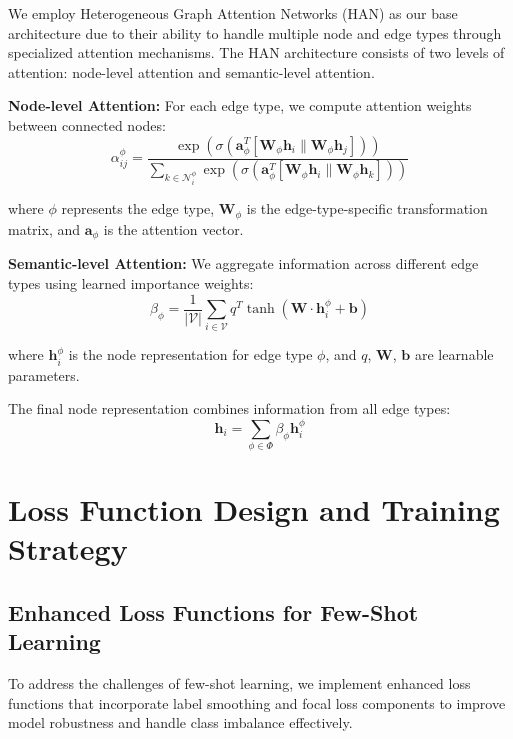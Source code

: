 We employ Heterogeneous Graph Attention Networks (HAN) as our base architecture due to their ability to handle multiple node and edge types through specialized attention mechanisms. The HAN architecture consists of two levels of attention: node-level attention and semantic-level attention.

\textbf{Node-level Attention:} For each edge type, we compute attention weights between connected nodes:
\begin{equation}
\alpha_{ij}^{\phi} = \frac{\exp(\sigma(\mathbf{a}_{\phi}^T[\mathbf{W}_{\phi}\mathbf{h}_i \| \mathbf{W}_{\phi}\mathbf{h}_j]))}{\sum_{k \in \mathcal{N}_i^{\phi}} \exp(\sigma(\mathbf{a}_{\phi}^T[\mathbf{W}_{\phi}\mathbf{h}_i \| \mathbf{W}_{\phi}\mathbf{h}_k]))}
\end{equation}

where $\phi$ represents the edge type, $\mathbf{W}_{\phi}$ is the edge-type-specific transformation matrix, and $\mathbf{a}_{\phi}$ is the attention vector.

\textbf{Semantic-level Attention:} We aggregate information across different edge types using learned importance weights:
\begin{equation}
\beta_{\phi} = \frac{1}{|\mathcal{V}|} \sum_{i \in \mathcal{V}} q^T \tanh(\mathbf{W} \cdot \mathbf{h}_i^{\phi} + \mathbf{b})
\end{equation}

where $\mathbf{h}_i^{\phi}$ is the node representation for edge type $\phi$, and $q$, $\mathbf{W}$, $\mathbf{b}$ are learnable parameters.

The final node representation combines information from all edge types:
\begin{equation}
\mathbf{h}_i = \sum_{\phi \in \Phi} \beta_{\phi} \mathbf{h}_i^{\phi}
\end{equation}

\section{Loss Function Design and Training Strategy}

\subsection{Enhanced Loss Functions for Few-Shot Learning}

To address the challenges of few-shot learning, we implement enhanced loss functions that incorporate label smoothing and focal loss components to improve model robustness and handle class imbalance effectively.

